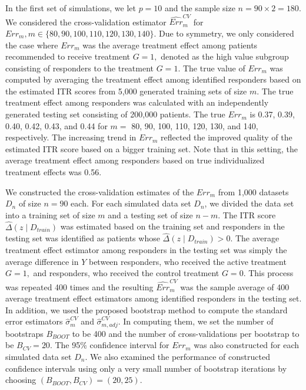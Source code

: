 \documentclass[12pt]{article}
\begin{document}
In the first set of simulations, we let $p=10$ and the sample size $n=90\times 2=180$.  We considered the cross-validation estimator $\widehat{Err}_m^{CV}$ for $Err_m, m\in\{80, 90, 100, 110, 120, 130, 140\}.$ Due to symmetry, we only considered the case where $Err_m$ was the average treatment effect among patients recommended to receive treatment $G=1,$ denoted as the high value subgroup consisting of responders to the treatment $G=1$.  The true value of $Err_m$ was computed by averaging the treatment effect among identified responders based on the estimated ITR scores from 5,000 generated training sets of size $m$. The true treatment effect among responders was calculated with an independently generated testing set consisting of 200,000 patients. The true $Err_m$ is 0.37, 0.39, 0.40, 0.42, 0.43, and 0.44 for $m=$ 80, 90, 100, 110, 120, 130, and 140, respectively. The increasing trend in $Err_m$ reflected the improved quality of the estimated ITR score based on a bigger training set. Note that in this setting, the average treatment effect among responders based on true individualized treatment effects was 0.56.

We constructed the cross-validation estimates of the $Err_m$ from 1,000 datasets $D_n$ of size $n=90$ each.  For each simulated data set $D_n$, we divided the data set into a training set of size $m$ and a testing set of size $n-m$. The ITR score $\widehat{\Delta}(z\mid D_{train})$ was estimated based on the training set and responders in the testing set was identified as patients whose $\widehat{\Delta}(z\mid D_{train})> 0$. The average treatment effect estimator among responders in the testing set was simply the average difference in $Y$ between responders, who received the active treatment $G=1,$ and responders, who received the control treatment $G=0.$ This process was repeated 400 times and the resulting $\widehat{Err}_m^{CV}$ was the sample average of 400 average treatment effect estimators among identified responders in the testing set.  In addition, we used the proposed bootstrap method to compute the standard error estimators $\hat{\sigma}_m^{CV}$ and $\hat{\sigma}_{m,adj}^{CV}.$ In computing them, we set the number of bootstraps $B_{BOOT}$ to be 400 and the number of cross-validations per bootstrap to be $B_{CV}=20.$ The 95\% confidence interval for $Err_m$ was also constructed for each simulated data set $D_n.$  We also examined the performance of constructed confidence intervals using only a very small number of bootstrap iterations by choosing $(B_{BOOT}, B_{CV})=(20, 25).$
\end{document}
